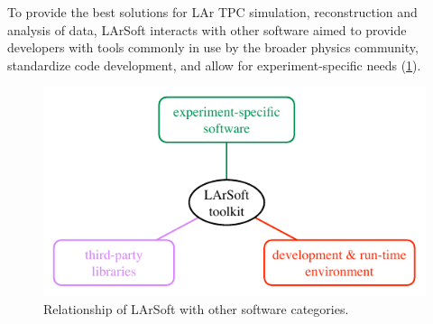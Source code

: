 
%
%

To provide the best solutions for LAr TPC simulation, reconstruction and
analysis of data, LArSoft interacts with other software aimed to
provide developers with tools commonly in use by the broader physics community,
standardize code development,
and allow for experiment-specific needs (\cref{fig:LArSoftRelations}).
\begin{figure}
   \centering
   \includegraphics{figures/LArSoftEnvironmentOverview}
   \caption[Relationship of LArSoft with other software categories]{
      \label{fig:LArSoftRelations}
      Relationship of LArSoft with other software categories.
   }
\end{figure}

